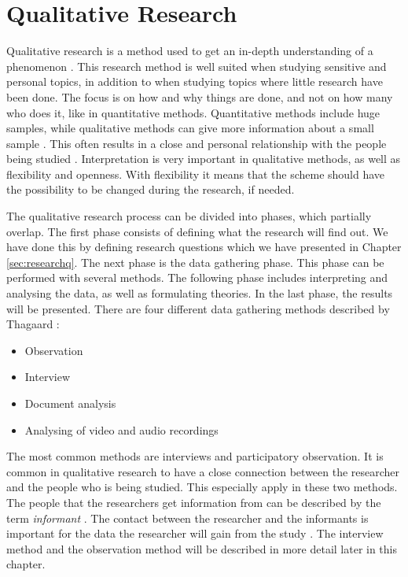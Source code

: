 \section{Qualitative Research}
\label{sec:qualitativeres}
Qualitative research is a method used to get an in-depth understanding of a phenomenon \cite{qualitative}. This research method is well suited when studying sensitive and personal topics, in addition to when studying topics where little research have been done. The focus is on how and why things are done, and not on how many who does it, like in quantitative methods. Quantitative methods include huge samples, while qualitative methods can give more information about a small sample \cite{qualitative}. This often results in a close and personal relationship with the people being studied \cite{tjora}. Interpretation is very important in qualitative methods, as well as flexibility and openness. With flexibility it means that the scheme should have the possibility to be changed during the research, if needed. 

The qualitative research process can be divided into phases, which partially overlap. The first phase consists of defining what the research will find out. We have done this by defining research questions which we have presented in Chapter \ref{sec:researchq}. The next phase is the data gathering phase. This phase can be performed with several methods. The following phase includes interpreting and analysing the data, as well as formulating theories. In the last phase, the results will be presented. There are four different data gathering methods described by Thagaard \cite{qualitative}:

\begin{itemize}
\item Observation 
\item Interview  
\item Document analysis
\item Analysing of video and audio recordings
\end{itemize}

The most common methods are interviews and participatory observation. It is common in qualitative research to have a close connection between the researcher and the people who is being studied. This especially apply in these two methods. The people that the researchers get information from can be described by the term \emph{informant} \cite{qualitative}. The contact between the researcher and the informants is important for the data the researcher will gain from the study \cite{qualitative}. The interview method and the observation method will be described in more detail later in this chapter.

